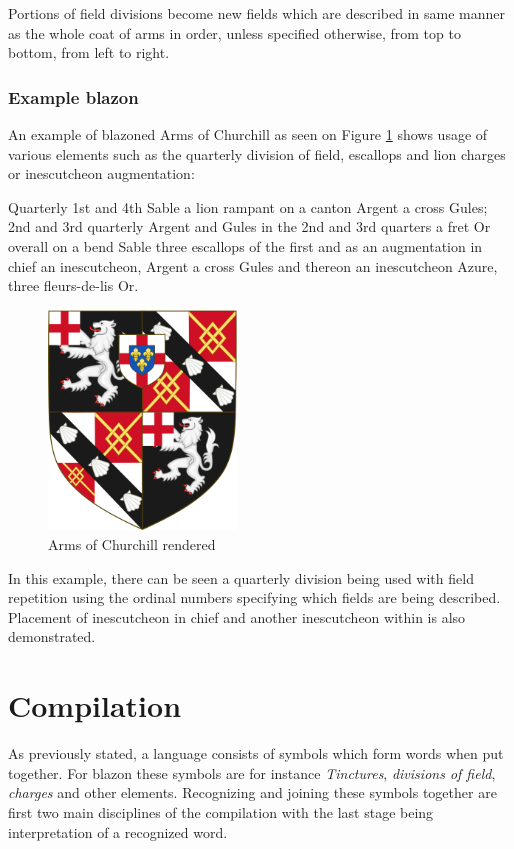 \documentclass[12pt,a4paper]{article}
\let\oldsection\section
\renewcommand\section{\clearpage\oldsection}
\begin{document}
Portions of field divisions become new fields which are described in same manner as the whole coat of arms in order, unless specified otherwise, from top to bottom, from left to right.

\subsubsection{Example blazon}
An example of blazoned Arms of Churchill as seen on Figure \ref{armsOfChurchillImg} shows usage of various elements such as the quarterly division of field, escallops and lion charges or inescutcheon augmentation:

Quarterly 1st and 4th Sable a lion rampant on a canton Argent a cross Gules;
2nd and 3rd quarterly Argent and Gules in the 2nd and 3rd quarters a fret Or overall on a bend Sable three escallops of the first and as an augmentation in chief an inescutcheon, Argent a cross Gules and thereon an inescutcheon Azure, three fleurs-de-lis Or.
\begin{figure}[h]
	\centering
	\includegraphics[width=50mm]{img/512px-Arms_of_Winston_Churchill.png}
	\caption{Arms of Churchill rendered \cite{ArmsOfChurchillImg}}
	\label{armsOfChurchillImg}
\end{figure}

In this example, there can be seen a quarterly division being used with field repetition using the ordinal numbers specifying which fields are being described. Placement of inescutcheon in chief and another inescutcheon within is also demonstrated.

\section{Compilation}
As previously stated, a language consists of symbols which form words when put together. For blazon these symbols are for instance \textit{Tinctures}, \textit{divisions of field}, \textit{charges} and other elements. Recognizing and joining these symbols together are first two main disciplines of the compilation with the last stage being interpretation of a recognized word.
\end{document}
